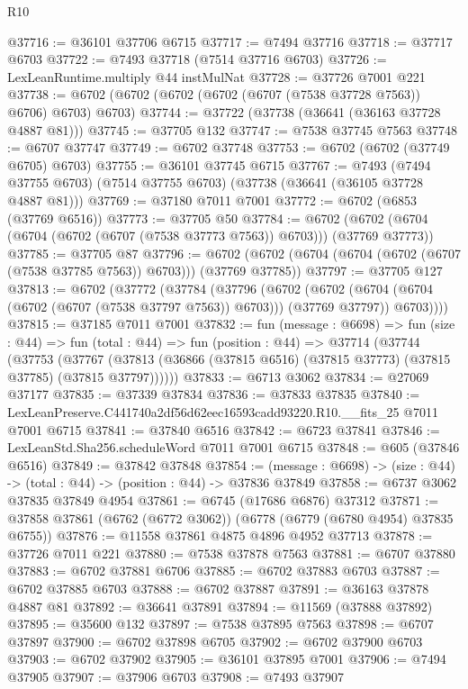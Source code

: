\begin{lexlean}{R10}
\begin{coremodule}
@37716 := @36101 @37706 @6715
@37717 := @7494 @37716
@37718 := @37717 @6703
@37722 := @7493 @37718 (@7514 @37716 @6703)
@37726 := LexLeanRuntime.multiply @44 instMulNat
@37728 := @37726 @7001 @221
@37738 := @6702 (@6702 (@6702 (@6702 (@6707 (@7538 @37728 @7563)) @6706) @6703) @6703)
@37744 := @37722 (@37738 (@36641 (@36163 @37728 @4887 @81)))
@37745 := @37705 @132
@37747 := @7538 @37745 @7563
@37748 := @6707 @37747
@37749 := @6702 @37748
@37753 := @6702 (@6702 (@37749 @6705) @6703)
@37755 := @36101 @37745 @6715
@37767 := @7493
    (@7494 @37755 @6703)
    (@7514 @37755 @6703)
    (@37738 (@36641 (@36105 @37728 @4887 @81)))
@37769 := @37180 @7011 @7001
@37772 := @6702 (@6853 (@37769 @6516))
@37773 := @37705 @50
@37784 := @6702 (@6702 (@6704 (@6704 (@6702 (@6707 (@7538 @37773 @7563)) @6703))) (@37769 @37773))
@37785 := @37705 @87
@37796 := @6702 (@6702 (@6704 (@6704 (@6702 (@6707 (@7538 @37785 @7563)) @6703))) (@37769 @37785))
@37797 := @37705 @127
@37813 := @6702
    (@37772
      (@37784
        (@37796
          (@6702
            (@6702 (@6704 (@6704 (@6702 (@6707 (@7538 @37797 @7563)) @6703))) (@37769 @37797))
            @6703))))
@37815 := @37185 @7011 @7001
@37832 := fun (message : @6698) =>
  fun (size : @44) =>
  fun (total : @44) =>
  fun (position : @44) =>
  @37714
    (@37744
      (@37753
        (@37767 (@37813 (@36866 (@37815 @6516) (@37815 @37773) (@37815 @37785) (@37815 @37797))))))
@37833 := @6713 @3062
@37834 := @27069 @37177
@37835 := @37339 @37834
@37836 := @37833 @37835
@37840 := LexLeanPreserve.C441740a2df56d62eec16593cadd93220.R10.__fits_25 @7011 @7001 @6715
@37841 := @37840 @6516
@37842 := @6723 @37841
@37846 := LexLeanStd.Sha256.scheduleWord @7011 @7001 @6715
@37848 := @605 (@37846 @6516)
@37849 := @37842 @37848
@37854 := (message : @6698) -> (size : @44) -> (total : @44) -> (position : @44) -> @37836 @37849
@37858 := @6737 @3062 @37835 @37849 @4954
@37861 := @6745 (@17686 @6876) @37312
@37871 := @37858 @37861 (@6762 (@6772 @3062)) (@6778 (@6779 (@6780 @4954) @37835 @6755))
@37876 := @11558 @37861 @4875 @4896 @4952 @37713
@37878 := @37726 @7011 @221
@37880 := @7538 @37878 @7563
@37881 := @6707 @37880
@37883 := @6702 @37881 @6706
@37885 := @6702 @37883 @6703
@37887 := @6702 @37885 @6703
@37888 := @6702 @37887
@37891 := @36163 @37878 @4887 @81
@37892 := @36641 @37891
@37894 := @11569 (@37888 @37892)
@37895 := @35600 @132
@37897 := @7538 @37895 @7563
@37898 := @6707 @37897
@37900 := @6702 @37898 @6705
@37902 := @6702 @37900 @6703
@37903 := @6702 @37902
@37905 := @36101 @37895 @7001
@37906 := @7494 @37905
@37907 := @37906 @6703
@37908 := @7493 @37907

\end{coremodule}
\end{lexlean}
